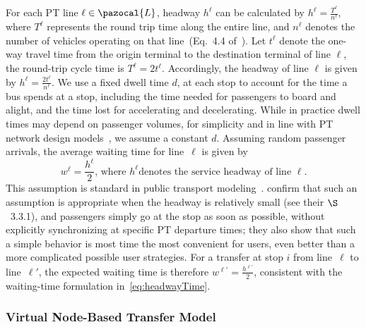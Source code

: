 \documentclass[a4paper,fleqn]{cas-sc}
\begin{document}
For each PT line $\ell \in \pazocal{L}$, headway $h^\ell$ can be calculated by $h^\ell = \frac{T^\ell}{n^\ell}$, where $T^\ell$ represents the round trip time along the entire line, and $n^\ell$ denotes the number of vehicles operating on that line~(Eq.~4.4 of~\citep{vuchic1981timed}).  
Let $t^\ell$ denote the one-way travel time from the origin terminal to the destination terminal of line $\ell$, the round-trip cycle time is $T^\ell = 2t^\ell$.
Accordingly, the headway of line $\ell$ is given by
$h^\ell = \frac{2t^\ell}{n^\ell}$.
%
We use a fixed dwell time $d$, at each stop to account for the time a bus spends at a stop, including the time needed for passengers to board and alight, and the time lost for accelerating and decelerating.
While in practice dwell times may depend on passenger volumes, for simplicity and in line with PT network design models~\citep{HUYNH2022392, chen2022TRSC}, we assume a constant $d$.
%
Assuming random passenger arrivals, the average waiting time for line~$\ell$ is given by
\begin{equation}
    w^\ell = \frac{h^\ell}{2}\text{, where }h^\ell \text{denotes the service headway of line~}\ell.
    \label{eq:headwayTime}
\end{equation}
This assumption is standard in public transport modeling~\citep{parbo2018reducing, zhang2018service}. 
\citet{liu2020does} confirm that such an assumption is appropriate when the headway is relatively small (see their $\S$~3.3.1), and passengers simply go at the stop as soon as possible, without explicitly synchronizing at specific PT departure times; they also show that such a simple behavior is most time the most convenient for users, even better than a more complicated possible user strategies.
%
For a transfer at stop $i$ from line~$\ell$ to line~$\ell'$, the expected waiting time is therefore
$w^{\ell'} = \frac{h^{\ell'}}{2}$, 
consistent with the waiting-time formulation in~\eqref{eq:headwayTime}.

\subsubsection{Virtual Node-Based Transfer Model}\label{sec:virtual_nodes}
\end{document}
